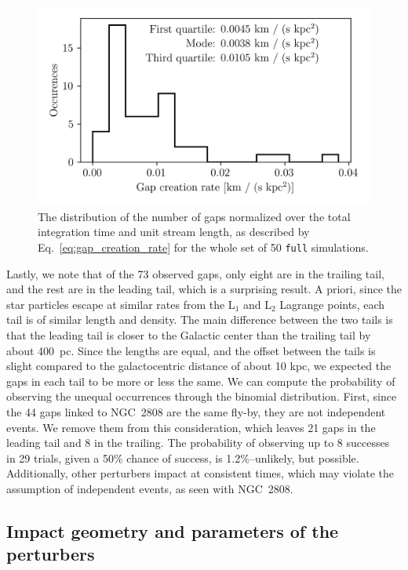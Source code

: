 \documentclass{aa}
\begin{document}
    \begin{figure}
      \centering
      \includegraphics[width=\linewidth]{gap_creation_rate.png}
      \caption{The distribution of the number of gaps normalized over the total integration time and unit stream length, as described by Eq.~\ref{eq:gap_creation_rate} for the whole set of 50 \texttt{full} simulations. }
      \label{fig:gapcreationrate}
    \end{figure}


    Lastly, we note that of the 73 observed gaps, only eight are in the trailing tail, and the rest are in the leading tail, which is a surprising result. A priori, since the star particles escape at similar rates from the L$_1$ and L$_2$ Lagrange points, each tail is of similar length and density. The main difference between the two tails is that the leading tail is closer to the Galactic center than the trailing tail by about 400~pc. Since the lengths are equal, and the offset between the tails is slight compared to the galactocentric distance of about 10 kpc, we expected the gaps in each tail to be more or less the same. We can compute the probability of observing the unequal occurrences through the binomial distribution. First, since the 44 gaps linked to NGC~2808 are the same fly-by, they are not independent events. We remove them from this consideration, which leaves 21 gaps in the leading tail and 8 in the trailing. The probability of observing up to 8 successes in 29 trials, given a 50\% chance of success, is 1.2\%--unlikely, but possible. Additionally, other perturbers impact at consistent times, which may violate the assumption of independent events, as seen with NGC~2808.


   
  \subsection{Impact geometry and parameters of the perturbers}\label{sect:geometry}
  
\end{document}
